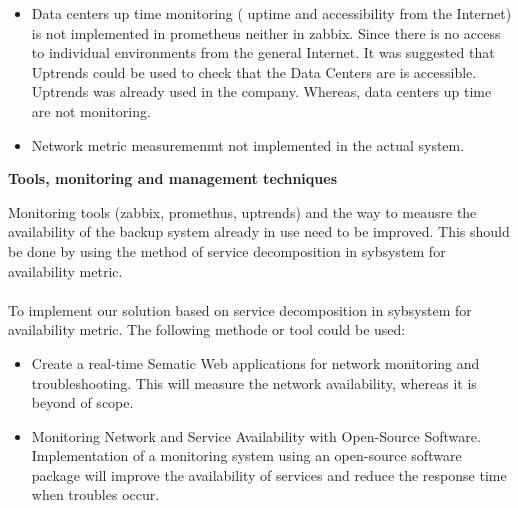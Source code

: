 \documentclass[english]{tktltiki2}
\theoremstyle{definition}
\theoremstyle{remark}
\begin{document}
\begin{itemize}
\item Data centers up time monitoring ( uptime and accessibility from the Internet) is not implemented in prometheus neither in zabbix.
Since there is no access to individual environments from the general Internet. 
It was suggested that Uptrends could be used to check that the Data Centers are is accessible. Uptrends was already used in the company. Whereas, data centers up time are not monitoring.
\end{itemize}

\begin{itemize}
\item Network metric measuremenmt not implemented in the actual system.
\end{itemize}


\begin{flushleft}
\textbf{Tools, monitoring and management techniques}
\end{flushleft}

Monitoring tools (zabbix, promethus, uptrends) and the way to meausre the availability of the backup system already in use need to be improved. This should be done by using the method of service decomposition in sybsystem for availability metric.\\ \\
To implement our solution based on  service decomposition in sybsystem for availability metric. The following methode or tool could be used:
\begin{itemize}
\item Create a  real-time Sematic Web applications for network monitoring and troubleshooting. This will measure the network availability, whereas it is beyond of scope.
\end{itemize}

\begin{itemize}
\item Monitoring Network and Service Availability with Open-Source Software.
Implementation of a monitoring system using an open-source software package will improve the
availability of services and reduce the response time when troubles occur.
\end{itemize}
\end{document}
